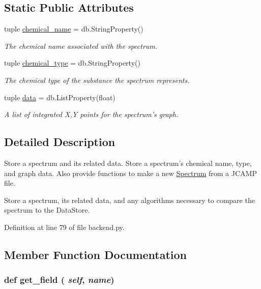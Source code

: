 \subsection*{Static Public Attributes}
\begin{DoxyCompactItemize}
\item 
tuple \hyperlink{classbackend_1_1_spectrum_a1a3576819984b70e068fa2a43a5b11df}{chemical\_\-name} = db.StringProperty()
\begin{DoxyCompactList}\small\item\em The chemical name associated with the spectrum. \item\end{DoxyCompactList}\item 
tuple \hyperlink{classbackend_1_1_spectrum_a97fd097feb78cab8b04a2ffd17a971d4}{chemical\_\-type} = db.StringProperty()
\begin{DoxyCompactList}\small\item\em The chemical type of the substance the spectrum represents. \item\end{DoxyCompactList}\item 
tuple \hyperlink{classbackend_1_1_spectrum_aa7a0efb8690a34f61a95b00cc723ca27}{data} = db.ListProperty(float)
\begin{DoxyCompactList}\small\item\em A list of integrated X,Y points for the spectrum's graph. \item\end{DoxyCompactList}\end{DoxyCompactItemize}


\subsection{Detailed Description}
Store a spectrum and its related data. Store a spectrum's chemical name, type, and graph data. Also provide functions to make a new \hyperlink{classbackend_1_1_spectrum}{Spectrum} from a JCAMP file.\begin{DoxyVerb}Store a spectrum, its related data, and any algorithms necessary
to compare the spectrum to the DataStore.\end{DoxyVerb}
 

Definition at line 79 of file backend.py.



\subsection{Member Function Documentation}
\hypertarget{classbackend_1_1_spectrum_af50426ecd14fc9667344dbf5407fb487}{
\subsubsection[{get\_\-field}]{\setlength{\rightskip}{0pt plus 5cm}def get\_\-field ( {\em self}, \/   {\em name})}}
\label{classbackend_1_1_spectrum_af50426ecd14fc9667344dbf5407fb487}


